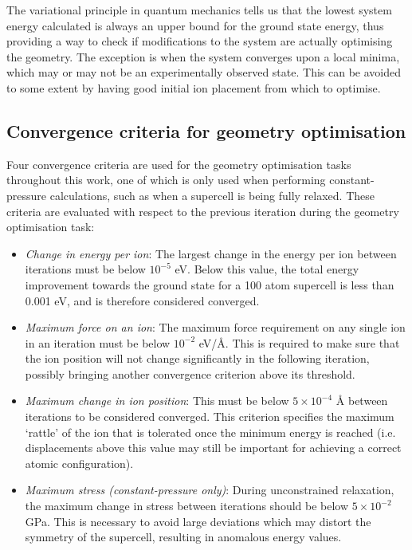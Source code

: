 The variational principle in quantum mechanics tells us that the lowest system energy calculated is always an upper bound for the ground state energy, thus providing a way to check if modifications to the system are actually optimising the geometry. The exception is when the system converges upon a local minima, which may or may not be an experimentally observed state. This can be avoided to some extent by having good initial ion placement from which to optimise.


\subsection{Convergence criteria for geometry optimisation} \label{convergence_criteria}

Four convergence criteria are used for the geometry optimisation tasks throughout this work, one of which is only used when performing constant-pressure calculations, such as when a supercell is being fully relaxed. These criteria are evaluated with respect to the previous iteration during the geometry optimisation task:

\begin{itemize}
\item \emph{Change in energy per ion}: The largest change in the energy per ion between iterations must be below $10^{-5}$ eV. Below this value, the total energy improvement towards the ground state for a 100 atom supercell is less than 0.001 eV, and is therefore considered converged.
\item \emph{Maximum force on an ion}: The maximum force requirement on any single ion in an iteration must be below $10^{-2}$ eV/\r{A}. This is required to make sure that the ion position will not change significantly in the following iteration, possibly bringing another convergence criterion above its threshold.
\item \emph{Maximum change in ion position}: This must be below $5 \times 10^{-4}$ \r{A} between iterations to be considered converged. This criterion specifies the maximum `rattle' of the ion that is tolerated once the minimum energy is reached (i.e. displacements above this value may still be important for achieving a correct atomic configuration). 
\item \emph{Maximum stress (constant-pressure only)}: During unconstrained relaxation, the maximum change in stress between iterations should be below $5 \times 10^{-2}$ GPa. This is necessary to avoid large deviations which may distort the symmetry of the supercell, resulting in anomalous energy values.
\end{itemize}

